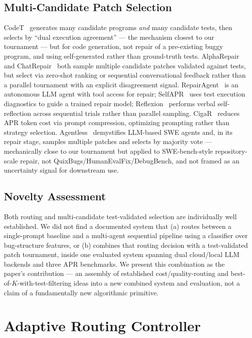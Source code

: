 \documentclass[conference]{IEEEtran}
\begin{document}
\subsection{Multi-Candidate Patch Selection}
CodeT~\cite{codet} generates many candidate programs \emph{and} many candidate tests, then selects by ``dual execution agreement'' — the mechanism closest to our tournament — but for code generation, not repair of a pre-existing buggy program, and using self-generated rather than ground-truth tests. AlphaRepair~\cite{alpharepair} and ChatRepair~\cite{chatrepair} both sample multiple candidate patches validated against tests, but select via zero-shot ranking or sequential conversational feedback rather than a parallel tournament with an explicit disagreement signal. RepairAgent~\cite{repairagent} is an autonomous LLM agent with tool access for repair; SelfAPR~\cite{selfapr} uses test execution diagnostics to guide a trained repair model; Reflexion~\cite{reflexion} performs verbal self-reflection across sequential trials rather than parallel sampling. CigaR~\cite{cigar} reduces APR token cost via prompt compression, optimizing prompting rather than strategy selection. Agentless~\cite{agentless} demystifies LLM-based SWE agents and, in its repair stage, samples multiple patches and selects by majority vote — mechanically close to our tournament but applied to SWE-bench-style repository-scale repair, not QuixBugs/HumanEvalFix/DebugBench, and not framed as an uncertainty signal for downstream use.

\subsection{Novelty Assessment}
Both routing and multi-candidate test-validated selection are individually well established. We did not find a documented system that (a) routes between a single-prompt baseline and a multi-agent sequential pipeline using a classifier over bug-structure features, or (b) combines that routing decision with a test-validated patch tournament, inside one evaluated system spanning dual cloud/local LLM backends and three APR benchmarks. We present this combination as the paper's contribution — an assembly of established cost/quality-routing and best-of-$K$-with-test-filtering ideas into a new combined system and evaluation, not a claim of a fundamentally new algorithmic primitive.

\section{Adaptive Routing Controller}
\label{sec:router}
\end{document}
